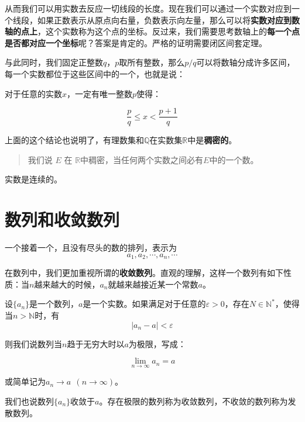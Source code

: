 从而我们可以用实数去反应一切线段的长度。现在我们可以通过一个实数对应到一个线段，如果正数表示从原点向右量，负数表示向左量，那么可以将\textbf{实数对应到数轴的点上}，这个实数称为这个点的坐标。反过来，我们需要思考数轴上的\textbf{每一个点是否都对应一个坐标}呢？答案是肯定的。严格的证明需要闭区间套定理。

与此同时，我们固定正整数\(q\)，\(p\)取所有整数，那么\(p/q\)可以将数轴分成许多区间，每一个实数都位于这些区间中的一个，也就是说：

对于任意的实数\(x\)，一定有唯一整数\(p\)使得：

\[\frac pq \le x < \frac{p+1}{q}\]

上面的这个结论也说明了，有理数集和\(\mathbb Q\)在实数集\(\mathbb R\)中是\textbf{稠密的}。

\begin{quote}
我们说 \(E\) 在 \(\mathbb R\)中稠密，当任何两个实数之间必有\(E\)中的一个数。
\end{quote}

\begin{theorem}
	实数是连续的。
\end{theorem}


\section{数列和收敛数列}

\begin{definition}[数列]
	一个接着一个，且没有尽头的数的排列，表示为
	\[a_1, a_2,\cdots, a_n,\cdots\]
\end{definition}


在数列中，我们更加重视所谓的\textbf{收敛数列}。直观的理解，这样一个数列有如下性质：当\(n\)越来越大的时候，\(a_n\)就越来越接近某一个常数\(a\)。

\begin{definition}[极限]
	设\(\{a_n\}\)是一个数列，\(a\)是一个实数。如果满足对于任意的\(\varepsilon>0\)，存在\(N\in \mathbb N^*\)，使得当\(n>\mathbb N\)时，有
	\[|a_n-a|< \varepsilon\]
	
\noindent 	则我们说数列当\(n\)趋于无穷大时以\(a\)为极限，写成：
	
	\[\lim_{n\rightarrow \infty} a_n = a\]
	
\noindent 	或简单记为\(a_n\rightarrow a~~(n\rightarrow \infty)\)。
	
我们也说数列\(\{a_n\}\)收敛于\(a\)。存在极限的数列称为收敛数列，不收敛的数列称为发散数列。
	
\end{definition}


